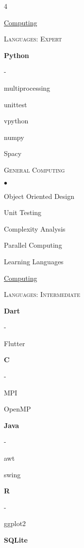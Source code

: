 \documentclass{article}
\newcommand{\skilltype}[1]{{\large \underline{#1}} \vspace{3pt} \\}
\newcommand{\skilllevel}[1]{
	\textsc{#1} \\ \vspace*{2pt}
	}
\newcommand{\languageskill}[1]{
    \hspace*{10pt} \textbf{#1}
    }
\newenvironment{skilllist}{\begin{list}{$\bullet$}{\topsep 0pt \itemsep -2pt}}{\vspace*{4pt}\end{list}}
\newenvironment{subskilllist}{\begin{list}{-}{\topsep 0pt \itemsep -2pt}}{\vspace*{4pt}\end{list}}
\begin{document}
\begin{multicols}{4}
\raggedcolumns
    
    \skilltype{Computing}
    \vspace{2pt}
    \skilllevel{Languages: Expert}
        \languageskill{Python}
            \begin{subskilllist}
            \item multiprocessing
            \item unittest
            \item vpython
            \item numpy
            \item Spacy 
            \end{subskilllist}
        
        \skilllevel{General Computing}
        
        \begin{skilllist}
            \item Object Oriented Design
            \item Unit Testing
            \item Complexity Analysis
            \item Parallel Computing
            \item Learning Languages
        \end{skilllist}
            

    
        \columnbreak
    
    \skilltype{Computing}
    \vspace{2pt}
    \skilllevel{Languages: Intermediate}
        \languageskill{Dart} 
            \begin{subskilllist}
            \item Flutter
            \end{subskilllist}
        \languageskill{C}
            \begin{subskilllist}
            \item MPI
            \item OpenMP
            \end{subskilllist}
        
        \languageskill{Java}
            \begin{subskilllist}
            \item awt
            \item swing
            \end{subskilllist}
        \languageskill{R}
            \begin{subskilllist}
                \item ggplot2
            \end{subskilllist}
        \languageskill{SQLite}
        

\end{multicols}
\end{document}
